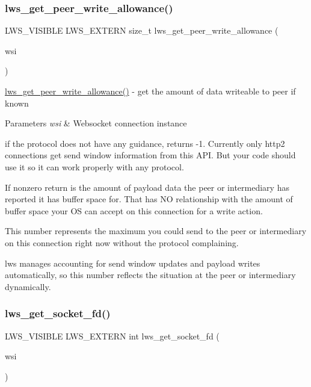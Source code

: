 \subsubsection{\texorpdfstring{lws\+\_\+get\+\_\+peer\+\_\+write\+\_\+allowance()}{lws\_get\_peer\_write\_allowance()}}
{\footnotesize\ttfamily L\+W\+S\+\_\+\+V\+I\+S\+I\+B\+LE L\+W\+S\+\_\+\+E\+X\+T\+E\+RN size\+\_\+t lws\+\_\+get\+\_\+peer\+\_\+write\+\_\+allowance (\begin{DoxyParamCaption}\item[{struct \hyperlink{structlws}{lws} $\ast$}]{wsi }\end{DoxyParamCaption})}

\hyperlink{group__callback-when-writeable_gac4643fe16b0940ae5b68b4ee6195cbde}{lws\+\_\+get\+\_\+peer\+\_\+write\+\_\+allowance()} -\/ get the amount of data writeable to peer if known


\begin{DoxyParams}{Parameters}
{\em wsi} & Websocket connection instance\\
\hline
\end{DoxyParams}
if the protocol does not have any guidance, returns -\/1. Currently only http2 connections get send window information from this A\+PI. But your code should use it so it can work properly with any protocol.

If nonzero return is the amount of payload data the peer or intermediary has reported it has buffer space for. That has NO relationship with the amount of buffer space your OS can accept on this connection for a write action.

This number represents the maximum you could send to the peer or intermediary on this connection right now without the protocol complaining.

lws manages accounting for send window updates and payload writes automatically, so this number reflects the situation at the peer or intermediary dynamically. \mbox{\label{group__callback-when-writeable_gaa709e02a10558753c851e58f1e2c16ba}} 
\subsubsection{\texorpdfstring{lws\+\_\+get\+\_\+socket\+\_\+fd()}{lws\_get\_socket\_fd()}}
{\footnotesize\ttfamily L\+W\+S\+\_\+\+V\+I\+S\+I\+B\+LE L\+W\+S\+\_\+\+E\+X\+T\+E\+RN int lws\+\_\+get\+\_\+socket\+\_\+fd (\begin{DoxyParamCaption}\item[{struct \hyperlink{structlws}{lws} $\ast$}]{wsi }\end{DoxyParamCaption})}

